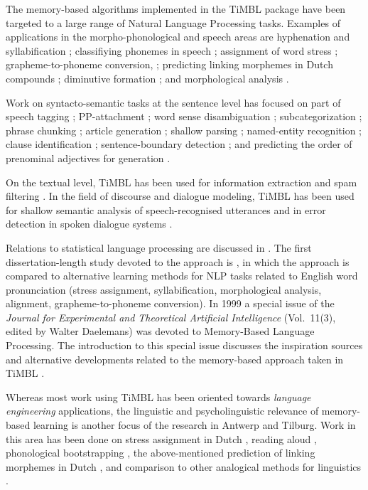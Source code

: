 \documentclass{report}
\begin{document}
The memory-based algorithms implemented in the TiMBL package have been
targeted to a large range of Natural Language Processing
tasks. Examples of applications in the morpho-phonological and speech areas are
hyphenation and syllabification \cite{Daelemans+92b}; classifiying
phonemes in speech \cite{Kocsor+00}; assignment of word stress
\cite{Daelemans+94b}; grapheme-to-phoneme conversion,
\cite{VandenBosch+93,Daelemans+96}; predicting linking morphemes in
Dutch compounds \cite{Krott+01}; diminutive formation
\cite{Daelemans+98a}; and morphological analysis
\cite{VandenBosch+96,VandenBosch+99}.

Work on syntacto-semantic tasks at the sentence level has  focused on
part of speech tagging \cite{Daelemans+96b,Zavrel+99,Halteren+01};
PP-attachment \cite{Zavrel+97b}; word sense disambiguation
\cite{Veenstra+00,Stevenson+99,Kokkinakis00}; subcategorization
\cite{Buchholz98}; phrase chunking \cite{Veenstra98,Sang+99}; article
generation \cite{Minnen+00}; shallow parsing
\cite{Daelemans+99a,Buchholz+99}; named-entity recognition
\cite{Buchholz+00}; clause identification \cite{Orasan00,Sang01};
sentence-boundary detection \cite{Stevenson+00}; and predicting the
order of prenominal adjectives for generation \cite{Malouf00}.

On the textual level, TiMBL has been used for information extraction
\cite{Zavrel+00b} and spam filtering \cite{Androutsopoulos+00}. In the
field of discourse and dialogue modeling, TiMBL has been used for
shallow semantic analysis of speech-recognised utterances
\cite{Gustafson+99} and in error detection in spoken dialogue systems
\cite{Krahmer+01,VandenBosch+01}.

Relations to statistical language processing are discussed in
\cite{Zavrel+97}. The first
dissertation-length study devoted to the approach is
\cite{VandenBosch97}, in which the approach is compared to alternative
learning methods for NLP tasks related to English word pronunciation
(stress assignment, syllabification, morphological analysis,
alignment, grapheme-to-phoneme conversion). In 1999 a special issue of
the {\em Journal for Experimental and Theoretical Artificial
Intelligence} (Vol.~11(3), edited by Walter Daelemans) was devoted to
Memory-Based Language Processing. The introduction to this special
issue discusses the inspiration sources and alternative developments
related to the memory-based approach taken in TiMBL
\cite{Daelemans99b}.

Whereas most work using TiMBL has been oriented towards {\em language
engineering} applications, the linguistic and psycholinguistic
relevance of memory-based learning is another focus of the research in
Antwerp and Tilburg. Work in this area has been done on stress
assignment in Dutch \cite{Daelemans+94b,Gillis+00}, reading aloud
\cite{Vandenbosch+00b}, phonological bootstrapping \cite{Durieux+00},
the above-mentioned prediction of linking morphemes in Dutch
\cite{Krott+01}, and comparison to other analogical methods for
linguistics \cite{Daelemans+97f}.
\end{document}
